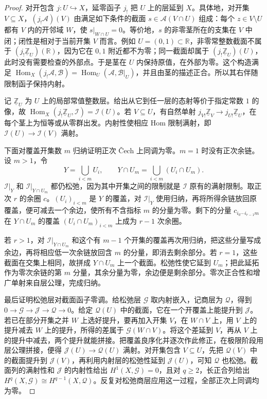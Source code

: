 \begin{proof}
	对开包含 \(j:U\hookrightarrow X\)，延零函子 \(j_!\) 把 \(U\) 上的层延到 \(X\)。具体地，对开集 \(V\subseteq X\)，\((j_!\mathcal A)(V)\) 由满足如下条件的截面 \(s\in\mathcal A(V\cap U)\) 组成：每个 \(z\in V\setminus U\) 都有 \(V\) 内的开邻域 \(W\)，使 \(s|_{W\cap U}=0\)。等价地，\(s\) 的非零茎所在的支集在 \(V\) 中闭；闭性是相对于当前开集 \(V\) 而言。例如 \(U=(0,1)\subset\mathbb R\)，非零常整数截面不属于 \((j_!\underline{\mathbb Z}_U)(\mathbb R)\)，因为它在 \(0,1\) 附近都不为零；同一截面却属于 \((j_!\underline{\mathbb Z}_U)(U)\)，此时没有需要检查的外部点。于是茎在 \(U\) 内保持原值，在外部为零。这个构造满足 \(\operatorname{Hom}_X(j_!\mathcal A,\mathcal B)=\operatorname{Hom}_U(\mathcal A,\mathcal B|_U)\)，并且由茎的描述正合。所以其右伴随限制函子保持内射。

	记 \(\underline{\mathbb Z}_U\) 为 \(U\) 上的局部常值整数层。给出从它到任一层的态射等价于指定常数 \(1\) 的像，故 \(\operatorname{Hom}_X(j_!\underline{\mathbb Z}_U,\mathcal I)=\mathcal I(U)\)。若 \(V\subseteq U\)，有自然单射 \(j_{V!}\underline{\mathbb Z}_V\rightarrow j_{U!}\underline{\mathbb Z}_U\)，在每个茎上为恒等或从零群出发。内射性使相应 Hom 限制满射，即 \(\mathcal I(U)\rightarrow\mathcal I(V)\) 满射。

	下面对覆盖开集数 \(m\) 归纳证明正次 Čech 上同调为零。\(m=1\) 时没有正次余链。设 \(m>1\)，令
	\[
		Y=\bigcup_{i<m}U_i, \qquad Y\cap U_m=\bigcup_{i<m}(U_i\cap U_m).
	\]
	\(\mathcal I|_Y\) 和 \(\mathcal I|_{Y\cap U_m}\) 都仍松弛，因为其中开集之间的限制就是 \(\mathcal I\) 原有的满射限制。取正次 \(r\) 的余圈 \(c\)。\((U_i)_{i<m}\) 是 \(Y\) 的覆盖，对 \(\mathcal I|_Y\) 使用归纳，再将所得余链放回原覆盖，便可减去一个余边，使所有不含指标 \(m\) 的分量为零。剩下的分量 \(c_{i_0\cdots i_{r-1}m}\) 在 \(Y\cap U_m\) 的覆盖 \((U_i\cap U_m)_{i<m}\) 上成为 \(r-1\) 次余圈。

	若 \(r>1\)，对 \(\mathcal I|_{Y\cap U_m}\) 和这个有 \(m-1\) 个开集的覆盖再次用归纳，把这些分量写成余边，再将相应低一次余链放回含 \(m\) 的分量，即消去剩余部分。若 \(r=1\)，这些截面在交集上相同，故拼成 \(Y\cap U_m\) 上一个截面。松弛性使它延到 \(U_m\)；把此延拓作为零次余链的第 \(m\) 分量，其余分量为零，余边便是剩余部分。零次正合性和增广单射来自层公理，完成归纳。

	最后证明松弛层对截面函子零调。给松弛层 \(\mathcal G\) 取内射嵌入，记商层为 \(\mathcal Q\)，得到 \(0\to\mathcal G\to\mathcal J\to\mathcal Q\to0\)。给定 \(\mathcal Q(U)\) 中的截面，它在一个开覆盖上能提升到 \(\mathcal J\)。若已在部分开集之并 \(W\) 上选好提升，要再加入开集 \(V\)，在 \(W\cap V\) 上，用 \(V\) 上的提升减去 \(W\) 上的提升，所得的差属于 \(\mathcal G(W\cap V)\)。将这个差延到 \(V\)，再从 \(V\) 上的提升中减去，两个提升就能拼接。把覆盖良序化并逐次作此修正，在极限阶段用层公理拼接，便得 \(\mathcal J(U)\to\mathcal Q(U)\) 满射。对开集包含 \(V\subseteq U\)，先把 \(\mathcal Q(V)\) 中的截面提升到 \(\mathcal J(V)\)，再利用内射层的松弛性延到 \(\mathcal J(U)\)，可知 \(\mathcal Q\) 也松弛。截面列的满射性和 \(\mathcal J\) 的内射性给出 \(H^1(X,\mathcal G)=0\)，且对 \(q\ge2\)，长正合列给出 \(H^q(X,\mathcal G)\cong H^{q-1}(X,\mathcal Q)\)。反复对松弛商层应用这一过程，全部正次上同调均为零。
\end{proof}

